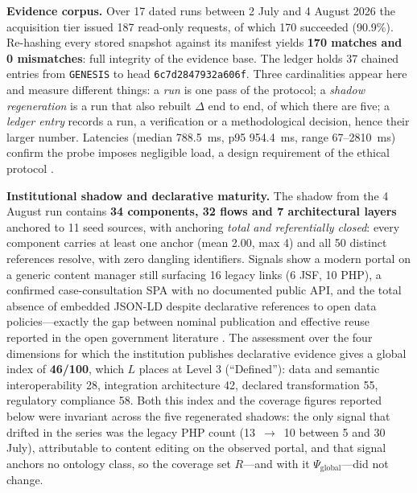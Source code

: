 \documentclass[engproc,proceedingpaper,submit,moreauthors]{Definitions/mdpi}
\begin{document}
\textbf{Evidence corpus.} Over 17 dated runs between 2 July and 4 August 2026 the acquisition tier issued 187 read-only requests, of which 170 succeeded (90.9\%). Re-hashing every stored snapshot against its manifest yields \textbf{170 matches and 0 mismatches}: full integrity of the evidence base. The ledger holds 37 chained entries from \texttt{GENESIS} to head \texttt{6c7d2847932a606f}. %
Three cardinalities appear here and measure different things: a \emph{run} is one pass of the protocol; a \emph{shadow regeneration} is a run that also rebuilt $\Delta$ end to end, of which there are five; a \emph{ledger entry} records a run, a verification or a methodological decision, hence their larger number. Latencies (median 788.5~ms, p95 954.4~ms, range 67--2810~ms) confirm the probe imposes negligible load, a design requirement of the ethical protocol \cite{Krotov2020}.

\textbf{Institutional shadow and declarative maturity.} The shadow from the 4 August run contains \textbf{34 components, 32 flows and 7 architectural layers} anchored to 11 seed sources, with anchoring \emph{total and referentially closed}: every component carries at least one anchor (mean 2.00, max 4) and all 50 distinct references resolve, with zero dangling identifiers. Signals show a modern portal on a generic content manager still surfacing 16 legacy links (6 JSF, 10 PHP), a confirmed case-consultation SPA with no documented public API, and the total absence of embedded JSON-LD despite declarative references to open data policies---exactly the gap between nominal publication and effective reuse reported in the open government literature \cite{Janssen2012,Attard2015}. The assessment over the four dimensions for which the institution publishes declarative evidence gives a global index of \textbf{46/100}, which $L$ places at Level 3 (``Defined''): data and semantic interoperability 28, integration architecture 42, declared transformation 55, regulatory compliance 58. Both this index and the coverage figures reported below were invariant across the five regenerated shadows: the only signal that drifted in the series was the legacy PHP count (13~$\rightarrow$~10 between 5 and 30 July), attributable to content editing on the observed portal, and that signal anchors no ontology class, so the coverage set $R$---and with it $\Psi_{\mathrm{global}}$---did not change.
\end{document}
